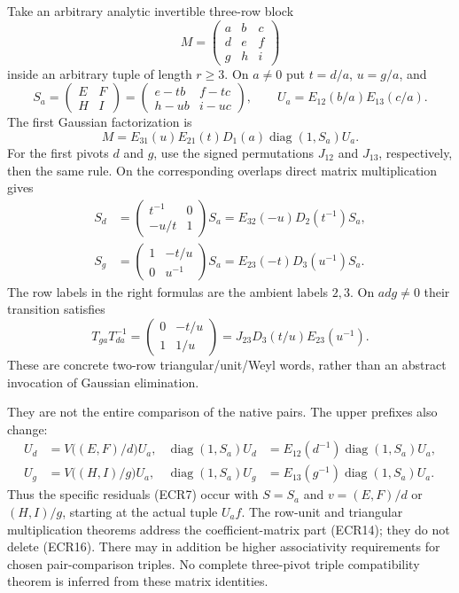 Take an arbitrary analytic invertible three-row block
\[
 M=\begin{pmatrix}a&b&c\\d&e&f\\g&h&i\end{pmatrix}
\]
inside an arbitrary tuple of length $r\ge3$.  On $a\ne0$ put
$t=d/a$, $u=g/a$, and
\[
 S_a=\begin{pmatrix}E&F\\H&I\end{pmatrix}
 =\begin{pmatrix}e-tb&f-tc\\h-ub&i-uc\end{pmatrix},\qquad
 U_a=E_{12}(b/a)E_{13}(c/a).
 \tag{ECR12}
\]
The first Gaussian factorization is
\[
       M=E_{31}(u)E_{21}(t)
               D_1(a)\operatorname{diag}(1,S_a)U_a.
 \tag{ECR13}
\]
For the first pivots $d$ and $g$, use the signed permutations
$J_{12}$ and $J_{13}$, respectively, then the same rule.  On
the corresponding overlaps direct matrix multiplication gives
\[
 \begin{split}
 S_d&=\begin{pmatrix}t^{-1}&0\\-u/t&1\end{pmatrix}S_a
                         =E_{32}(-u)D_2(t^{-1})S_a,\\
 S_g&=\begin{pmatrix}1&-t/u\\0&u^{-1}\end{pmatrix}S_a
                         =E_{23}(-t)D_3(u^{-1})S_a.
 \end{split}
 \tag{ECR14}
\]
The row labels in the right formulas are the ambient labels
$2,3$.  On $adg\ne0$ their transition satisfies
\[
 T_{ga}T_{da}^{-1}
  =\begin{pmatrix}0&-t/u\\1&1/u\end{pmatrix}
                  =J_{23}D_3(t/u)E_{23}(u^{-1}).
 \tag{ECR15}
\]
These are concrete two-row triangular/unit/Weyl words, rather
than an abstract invocation of Gaussian elimination.

They are not the entire comparison of the native pairs.  The
upper prefixes also change:
\[
 \begin{split}
 U_d&=V\bigl((E,F)/d\bigr)U_a,
       &\operatorname{diag}(1,S_a)U_d
          &=E_{12}(d^{-1})\operatorname{diag}(1,S_a)U_a,\\
 U_g&=V\bigl((H,I)/g\bigr)U_a,
       &\operatorname{diag}(1,S_a)U_g
          &=E_{13}(g^{-1})\operatorname{diag}(1,S_a)U_a.
 \end{split}
 \tag{ECR16}
\]
Thus the specific residuals (ECR7) occur with $S=S_a$ and
$v=(E,F)/d$ or $(H,I)/g$, starting at the actual tuple $U_af$.
The row-unit and triangular multiplication theorems address the
coefficient-matrix part (ECR14); they do not delete (ECR16).
There may in addition be higher associativity requirements for
chosen pair-comparison triples.  No complete three-pivot triple
compatibility theorem is inferred from these matrix identities.

